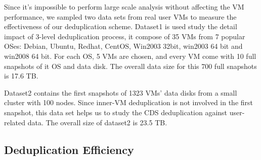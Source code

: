 

Since it's impossible to perform large scale analysis without affecting the VM performance,
we sampled two data sets from real user VMs to measure the effectiveness of our deduplication scheme.
Dataset1 is used study the detail impact of 3-level deduplication process,
it compose of 35 VMs from 7 popular OSes: 
Debian, Ubuntu, Redhat, CentOS, Win2003 32bit, win2003 64 bit and win2008 64 bit. For each OS, 
5 VMs are chosen, and every VM come with 10 full snapshots of it OS and data disk. 
The overall data size for this 700 full snapshots is 17.6 TB.

Dataset2 contains the first snapshots of 1323 VMs' data disks from a small cluster with 100 nodes. 
Since inner-VM deduplication is not involved in the first snapshot, this data set helps us to 
study the CDS deduplication against user-related data. The overall size of dataset2 is 23.5 TB.


\subsection{Deduplication Efficiency}



